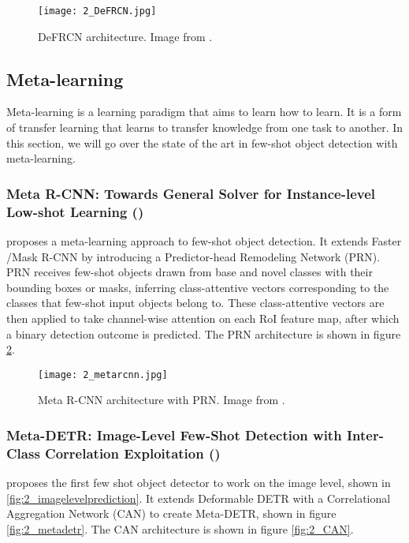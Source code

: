 \begin{figure}[h]
	\centering
	\texttt{[image: 2\_DeFRCN.jpg]}
	\caption{\label{fig:2_DeFRCN} DeFRCN architecture. Image from \citet{DeFRCN}.}
\end{figure}

\subsection{Meta-learning}
Meta-learning is a learning paradigm that aims to learn how to learn. It is a form of transfer learning that learns to transfer knowledge from one task to another. In this section, we will go over the state of the art in few-shot object detection with meta-learning.

\subsubsection{Meta R-CNN: Towards General Solver for Instance-level Low-shot Learning (\citet{meta-rcnn})}
\citet{meta-rcnn} proposes a meta-learning approach to few-shot object detection. It extends
Faster /Mask R-CNN\cite{maskrcnn} by introducing a Predictor-head Remodeling Network (PRN). PRN receives few-shot objects drawn from base and novel classes with their bounding boxes or masks, inferring class-attentive vectors corresponding to the classes that few-shot input objects belong to. These class-attentive vectors are then applied to take channel-wise attention on each RoI feature map, after which a binary detection outcome is predicted. The PRN architecture is shown in figure \ref{fig:2_metarcnn}.

\begin{figure}[h]
	\centering
	\texttt{[image: 2\_metarcnn.jpg]}
	\caption{\label{fig:2_metarcnn} Meta R-CNN architecture with PRN. Image from \citet{meta-rcnn}.}
\end{figure}

\subsubsection{Meta-DETR: Image-Level Few-Shot Detection with Inter-Class Correlation Exploitation (\citet{MetaDETR})}
\citet{MetaDETR} proposes the first few shot object detector to work on the image level, shown in \ref{fig:2_imagelevelprediction}. It extends Deformable DETR with a Correlational Aggregation Network (CAN) to create Meta-DETR, shown in figure \ref{fig:2_metadetr}. The CAN architecture is shown in figure \ref{fig:2_CAN}. 

